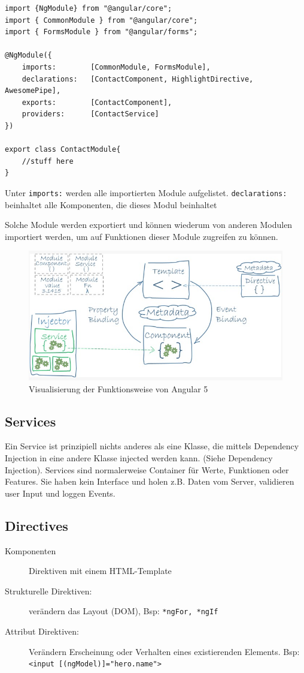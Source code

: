 \documentclass[a4paper, 11pt]{article}
\newcommand{\code}[1]{\texttt{#1}}
\begin{document}
\begin{lstlisting}
import {NgModule} from "@angular/core";
import { CommonModule } from "@angular/core";
import { FormsModule } from "@angular/forms";

@NgModule({
	imports:		[CommonModule, FormsModule],
	declarations:	[ContactComponent, HighlightDirective, AwesomePipe],
	exports:		[ContactComponent],
	providers:		[ContactService]
})

export class ContactModule{
	//stuff here
}
\end{lstlisting}
Unter \code{imports:} werden alle importierten Module aufgelistet. \code{declarations:} beinhaltet alle Komponenten, die dieses Modul beinhaltet 

Solche Module werden exportiert und können wiederum von anderen Modulen importiert werden, um auf Funktionen dieser Module zugreifen zu können.

\begin{figure}[htb]
	\centering
	\includegraphics[keepaspectratio=true,height=14\baselineskip]{Angular_comps.jpeg}
	\caption{Visualisierung der Funktionsweise von Angular 5}
	\label{fig:angular}
\end{figure}

\subsection{Services}
Ein Service ist prinzipiell nichts anderes als eine Klasse, die mittels Dependency Injection in eine andere Klasse injected werden kann. (Siehe Dependency Injection). Services sind normalerweise Container für Werte, Funktionen oder Features. Sie haben kein Interface und holen z.B. Daten vom Server, validieren user Input und loggen Events.

\newpage

\subsection{Directives}
\begin{description}
	\item[Komponenten] Direktiven mit einem HTML-Template
	\item[Strukturelle Direktiven: ] verändern das Layout (DOM), Bsp: \code{*ngFor, *ngIf}
	\item[Attribut Direktiven:] Verändern Erscheinung oder Verhalten eines existierenden Elements. Bsp: \code{<input [(ngModel)]="hero.name">}
\end{description}
\end{document}
